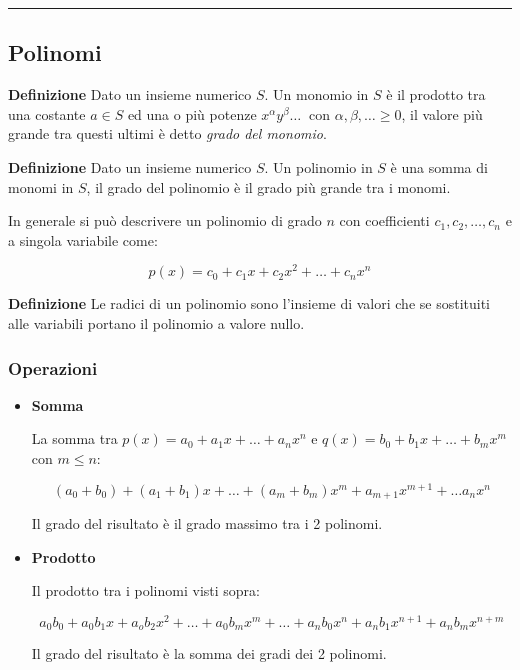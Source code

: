 \documentclass{article}
\begin{document}
\noindent\rule{\textwidth}{0.5pt}

\subsection{Polinomi}

\textbf{Definizione} Dato un insieme numerico $S$. Un monomio in $S$ è il prodotto tra una costante $a\in S$ ed una o più potenze $x^\alpha y^\beta\ldots\ $ con $\alpha,\beta,\ldots\geq0$, il valore più grande tra questi ultimi è detto \textit{grado del monomio}.\newline

\noindent\textbf{Definizione} Dato un insieme numerico $S$. Un polinomio in $S$ è una somma di monomi in $S$, il grado del polinomio è il grado più grande tra i monomi.\newline

\noindent In generale si può descrivere un polinomio di grado $n$ con coefficienti $c_1,c_2,\ldots,c_n$ e a singola variabile come:

$$p(x)=c_0+c_1x+c_2x^2+\ldots+c_nx^n$$\newline

\noindent\textbf{Definizione} Le radici di un polinomio sono l'insieme di valori che se sostituiti alle variabili portano il polinomio a valore nullo.\newline

\subsubsection{Operazioni}

\begin{itemize}
    \item \textbf{Somma}

    La somma tra $p(x)=a_0+a_1x+\ldots+a_nx^n$ e $q(x)=b_0+b_1x+\ldots+b_mx^m$ con $m\leq n$:

    $$(a_0+b_0)+(a_1+b_1)x+\ldots+(a_m+b_m)x^m+a_{m+1}x^{m+1}+\ldots
    a_nx^n$$

    Il grado del risultato è il grado massimo tra i 2 polinomi.

    \item \textbf{Prodotto}

    Il prodotto tra i polinomi visti sopra:

    $$a_0b_0+a_0b_1x+a_ob_2x^2+\ldots+a_0b_mx^m+\ldots+a_nb_0x^n+a_nb_1x^{n+1}+a_nb_mx^{n+m}$$

    Il grado del risultato è la somma dei gradi dei 2 polinomi.\newline
    
\end{itemize}
\end{document}
